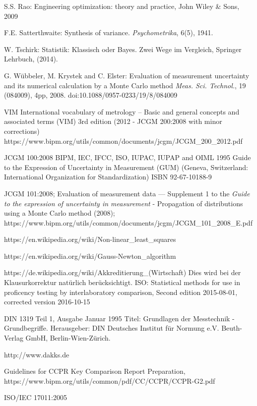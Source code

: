 \documentclass[a4paper,11pt]{book}
\begin{document}
\begin{flushleft}
\begin{thebibliography}{------}
     S.S. Rao: Engineering optimization: theory and practice,
    John Wiley \& Sons, 2009

     F.E. Satterthwaite: Synthesis of variance. {\em Psychometrika}, 6(5), 1941.

     W. Tschirk: Statistik: Klassisch oder Bayes. Zwei Wege im Vergleich, Springer Lehrbuch, (2014).

     G. Wübbeler, M. Krystek and C. Elster: Evaluation of measurement uncertainty
    and its numerical calculation by a Monte Carlo method
    {\em Meas. Sci. Technol.}, 19 (084009), 4pp, 2008.
    doi:10.1088/0957-0233/19/8/084009


     VIM International vocabulary of metrology – Basic and general
     concepts and associated terms (VIM) 3rd edition (2012 - JCGM 200:2008 with minor corrections)
     \newline https://www.bipm.org/utils/common/documents/jcgm/JCGM\_200\_2012.pdf

     JCGM 100:2008 BIPM, IEC, IFCC, ISO, IUPAC, IUPAP and OIML 1995 Guide to the Expression of Uncertainty in Measurement (GUM)
    (Geneva, Switzerland: International Organization for
    Standardization) ISBN 92-67-10188-9

    JCGM 101:2008; Evaluation of measurement data — Supplement 1 to the
    \textsl{Guide to the expression of uncertainty in measurement} -
    Propagation of distributions using a Monte Carlo method (2008); \newline
    https://www.bipm.org/utils/common/documents/jcgm/JCGM\_101\_2008\_E.pdf

     https://en.wikipedia.org/wiki/Non-linear\_least\_squares

     https://en.wikipedia.org/wiki/Gauss-Newton\_algorithm

     https://de.wikipedia.org/wiki/Akkreditierung\_(Wirtschaft)
 Dies wird bei der Klausurkorrektur natürlich berücksichtigt.
     ISO: Statistical methods for use in proficency testing by interlaboratory comparison, Second edition 2015-08-01, corrected version 2016-10-15

     DIN 1319 Teil 1, Ausgabe Januar 1995 Titel: Grundlagen der Messtechnik - Grundbegriffe. Herausgeber: DIN Deutsches Institut für Normung e.V. Beuth-Verlag GmbH, Berlin-Wien-Zürich.

     http://www.dakks.de

     Guidelines for CCPR Key Comparison Report
    Preparation, https://www.bipm.org/utils/common/pdf/CC/CCPR/CCPR-G2.pdf

    ISO/IEC 17011:2005
\end{thebibliography}
\end{flushleft}
\end{document}
